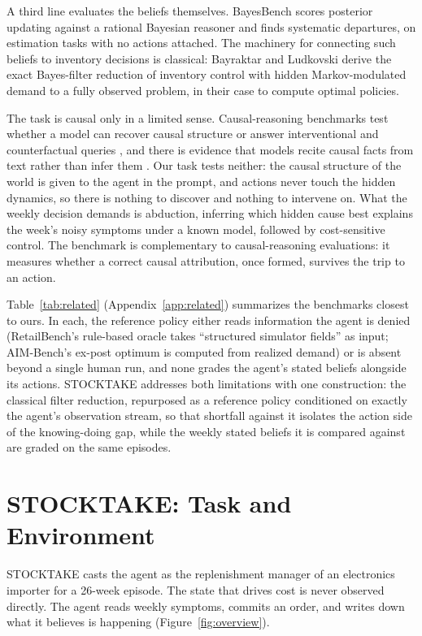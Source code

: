 \documentclass{article}
\begin{document}
A third line evaluates the beliefs themselves. BayesBench
\citep{bayesbench2026} scores posterior updating against a rational Bayesian
reasoner and finds systematic departures, on estimation tasks with no
actions attached. The machinery for connecting such beliefs to inventory
decisions is classical: Bayraktar and Ludkovski
\citep{bayraktar2010inventory} derive the exact Bayes-filter reduction of
inventory control with
hidden Markov-modulated demand to a fully observed problem, in their case
to compute optimal policies.

The task is causal only in a limited sense. Causal-reasoning benchmarks test
whether a model can recover causal structure or answer interventional and
counterfactual queries \citep{cladder2023}, and there is evidence that
models recite causal facts from text rather than infer them
\citep{zecevic2023parrots}. Our task tests neither: the causal structure
of the world is given to the agent in the prompt, and actions never touch
the hidden dynamics, so there is nothing to discover and nothing to
intervene on. What the weekly decision demands is abduction, inferring
which hidden cause best explains the week's noisy symptoms under a known
model, followed by cost-sensitive control. The benchmark is
complementary to causal-reasoning evaluations: it measures whether a
correct causal attribution, once formed, survives the trip to an action.

Table~\ref{tab:related} (Appendix~\ref{app:related}) summarizes the
benchmarks closest to ours. In each,
the reference policy either reads information the agent is denied
(RetailBench's rule-based oracle takes ``structured simulator fields'' as
input; AIM-Bench's ex-post optimum is computed from realized demand) or is
absent beyond a single human run, and none grades the agent's stated
beliefs alongside its actions. STOCKTAKE addresses both limitations with
one construction: the classical filter reduction, repurposed as a reference
policy conditioned on exactly the agent's observation stream, so that
shortfall against it isolates the action side of the knowing-doing gap,
while the weekly stated beliefs it is compared against are graded on the
same episodes.

\section{STOCKTAKE: Task and Environment}

STOCKTAKE casts the agent as the replenishment manager of an electronics
importer for a 26-week episode. The state that drives cost is never
observed directly. The agent reads weekly symptoms, commits an
order, and writes down what it believes is happening
(Figure~\ref{fig:overview}).
\end{document}
